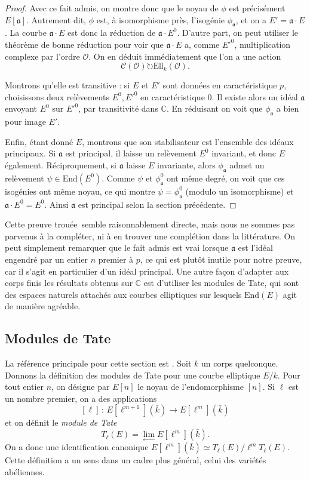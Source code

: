\documentclass[11pt,a4paper]{article}
\newcommand{\C}{\mathbb{C}}
\renewcommand{\O}{\mathcal{O}}
\newcommand{\Cl}{\mathcal{C}}
\newcommand{\vers}{\longrightarrow}
\newcommand{\End}{\mathrm{End}}
\newcommand{\Ell}{\mathrm{Ell}}
\renewcommand{\frak}{\mathfrak}
\newcommand{\de}{\,:\,}
\renewcommand{\v}{\vspace{5mm}}
\theoremstyle{definition}
\begin{document}
\begin{proof}
Avec ce fait admis, on montre donc que le noyau de $\phi$ est précisément $E[\frak a]$. Autrement dit, $\phi$ est, à isomorphisme près, l'isogénie $\phi_{\frak a}$, et on a $E' = \frak a\cdot E$. La courbe $\frak a\cdot E$ est donc la réduction de $\frak a\cdot E^0$. D'autre part, on peut utiliser le théorème de bonne réduction pour voir que $\frak a\cdot E$ a, comme $E'^0$, multiplication complexe par l'ordre $\O$. On en déduit immédiatement que l'on a une action
$$\Cl(\O) \circlearrowright \Ell_k(\O).$$

Montrons qu'elle est transitive : si $E$ et $E'$ sont données en caractéristique $p$, choisissons deux relèvements $E^0, E'^0$ en caractéristique 0. Il existe alors un idéal $\frak a$ envoyant $E^0$ sur $E'^0$, par transitivité dans $\C$. En réduisant on voit que $\phi_{\frak a}$ a bien pour image $E'$.

Enfin, étant donné $E$, montrons que son stabilisateur est l'ensemble des idéaux principaux. Si $\frak a$ est principal, il laisse un relèvement $E^0$ invariant, et donc $E$ également. Réciproquement, si $\frak a$ laisse $E$ invariante, alors $\phi_{\frak a}$ admet un relèvement $\psi\in \End(E^0)$. Comme $\psi$ et $\phi_{\frak a}^0$ ont même degré, on voit que ces isogénies ont même noyau, ce qui montre $\psi=\phi_{\frak a}^0$ (modulo un isomorphisme) et $\frak a\cdot E^0 = E^0$. Ainsi $\frak a$ est principal selon la section précédente.
\end{proof}
\v

Cette preuve \og trouée\fg\ semble raisonnablement directe, mais nous ne sommes pas parvenus à la compléter, ni à en trouver une complétion dans la littérature. On peut simplement remarquer que le fait admis est vrai lorsque $\frak a$ est l'idéal engendré par un entier $n$ premier à $p$, ce qui est plutôt inutile pour notre preuve, car il s'agit en particulier d'un idéal principal. Une autre façon d'adapter aux corps finis les résultats obtenus sur $\C$ est d'utiliser les modules de Tate, qui sont des espaces naturels attachés aux courbes elliptiques sur lesquels $\End(E)$ agit de manière agréable.


\subsection{Modules de Tate}


La référence principale pour cette section est \cite{Waterhouse}. Soit $k$ un corps quelconque. Donnons la définition des modules de Tate pour une courbe elliptique $E/k$. Pour tout entier $n$, on désigne par $E[n]$ le noyau de l'endomorphisme $[n]$. Si $\ell$ est un nombre premier, on a des applications
$$ [\ell] \de E[\ell^{m+1}](\bar{k})\vers E[\ell^{m}](\bar{k})$$
et on définit le \emph{module de Tate}
$$T_\ell(E) = \lim_{\leftarrow} E[\ell^m](\bar{k}).$$
On a donc une identification canonique $E[\ell^m](\bar{k})\simeq T_\ell(E)/ \ell^{m} T_\ell(E)$. Cette définition a un sens dans un cadre plus général, celui des variétés abéliennes.
\v
\end{document}
